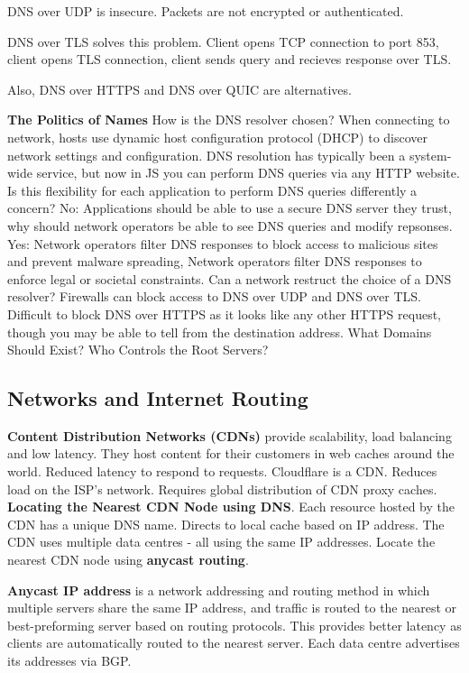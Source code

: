 \documentclass{article}
\begin{document}
DNS over UDP is insecure. Packets are not encrypted or authenticated.

DNS over TLS solves this problem. Client opens TCP connection to port 853, client opens TLS connection,
client sends query and recieves response over TLS\@.

Also, DNS over HTTPS and DNS over QUIC are alternatives.

\vspace{\baselineskip}
\textbf{The Politics of Names}
How is the DNS resolver chosen? When connecting to network, hosts use dynamic host configuration protocol (DHCP)
to discover network settings and configuration.
DNS resolution has typically been a system-wide service, but now in JS you can perform DNS queries via any HTTP website.
Is this flexibility for each application to perform DNS queries differently a concern?
No: Applications should be able to use a secure DNS server they trust, why should network operators be able to see DNS queries and modify repsonses.
Yes: Network operators filter DNS responses to block access to malicious sites and prevent malware spreading,
Network operators filter DNS responses to enforce legal or societal constraints.
Can a network restruct the choice of a DNS resolver?
Firewalls can block access to DNS over UDP and DNS over TLS\@.
Difficult to block DNS over HTTPS as it looks like any other HTTPS request, though you may be able to tell from the destination address.
What Domains Should Exist?
Who Controls the Root Servers?

\clearpage


\subsection*{Networks and Internet Routing}

\textbf{Content Distribution Networks (CDNs)} provide scalability, load balancing and low latency.
They host content for their customers in web caches around the world.
Reduced latency to respond to requests.
Cloudflare is a CDN\@.
Reduces load on the ISP's network.
Requires global distribution of CDN proxy caches.
\textbf{Locating the Nearest CDN Node using DNS}.
Each resource hosted by the CDN has a unique DNS name.
Directs to local cache based on IP address.
The CDN uses multiple data centres {-} all using the same IP addresses.
Locate the nearest CDN node using \textbf{anycast routing}.

\textbf{Anycast IP address} is a network addressing and routing method in which multiple servers share the same IP address,
and traffic is routed to the nearest or best-preforming server based on routing protocols.
This provides better latency as clients are automatically routed to the nearest server.
Each data centre advertises its addresses via BGP\@.
\end{document}
